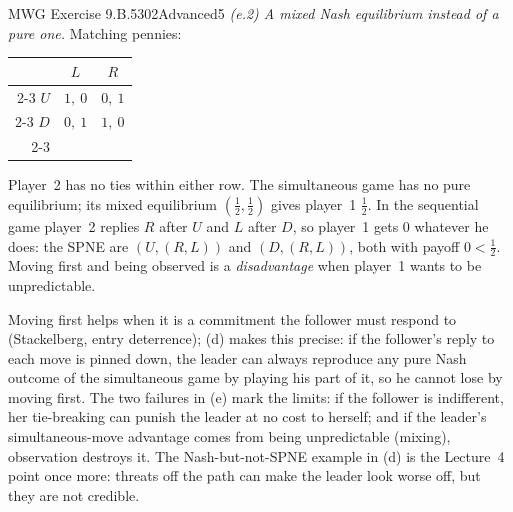 \begin{exsol}{MWG Exercise 9.B.5}{302}{Advanced}{5}
\emph{(e.2) A mixed Nash equilibrium instead of a pure one.} Matching pennies:
\begin{center}
\begin{tabular}{r|c|c|}
\multicolumn{1}{r}{} & \multicolumn{1}{c}{$L$} & \multicolumn{1}{c}{$R$}\\ \cline{2-3}
$U$ & $1,\ 0$ & $0,\ 1$ \\ \cline{2-3}
$D$ & $0,\ 1$ & $1,\ 0$ \\ \cline{2-3}
\end{tabular}
\end{center}
Player~2 has no ties within either row. The simultaneous game has no pure equilibrium; its mixed
equilibrium $(\frac12,\frac12)$ gives player~1 $\frac12$. In the sequential game player~2 replies $R$
after $U$ and $L$ after $D$, so player~1 gets 0 whatever he does: the SPNE are $(U, (R, L))$ and
$(D, (R, L))$, both with payoff $0 < \frac12$. Moving first and being observed is a
\emph{disadvantage} when player~1 wants to be unpredictable.

\interp Moving first helps when it is a commitment the follower must respond to (Stackelberg, entry
deterrence); (d) makes this precise: if the follower's reply to each move is pinned down, the leader
can always reproduce any pure Nash outcome of the simultaneous game by playing his part of it, so he
cannot lose by moving first. The two failures in (e) mark the limits: if the follower is indifferent,
her tie-breaking can punish the leader at no cost to herself; and if the leader's simultaneous-move
advantage comes from being unpredictable (mixing), observation destroys it. The Nash-but-not-SPNE
example in (d) is the Lecture~4 point once more: threats off the path can make the leader look worse
off, but they are not credible.


\end{exsol}
